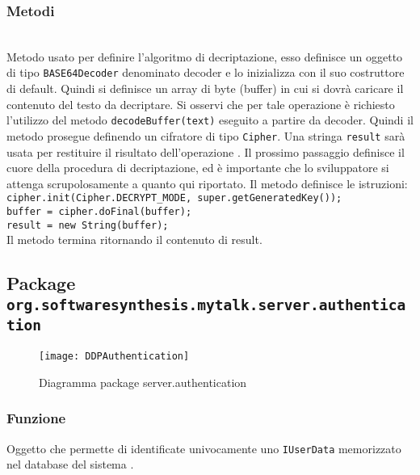 \subsubsection*{Metodi}
\begin{description}

	\item{}\\
	Metodo usato per definire l'algoritmo di decriptazione, esso definisce un oggetto di tipo \texttt{BASE64Decoder} denominato decoder e lo inizializza con il suo costruttore di default. Quindi si definisce un array di byte (buffer) in cui si dovrà caricare il contenuto del testo da decriptare. Si osservi che per tale operazione è richiesto l'utilizzo del metodo \texttt{decodeBuffer(text)} eseguito a partire da decoder. Quindi il metodo prosegue definendo  un cifratore di tipo \texttt{Cipher}. Una stringa \texttt{result} sarà usata per restituire il risultato dell'operazione . Il prossimo passaggio definisce il cuore della procedura di decriptazione, ed è importante che lo sviluppatore si attenga scrupolosamente a quanto qui riportato. Il metodo definisce le istruzioni:\\
	
	\verb|cipher.init(Cipher.DECRYPT_MODE, super.getGeneratedKey());|\\
	\verb|buffer = cipher.doFinal(buffer);|\\
	\verb|result = new String(buffer);|\\
	
	Il metodo termina ritornando il contenuto di result.
	
\end{description}

\subsection{Package \texttt{org.softwaresynthesis.mytalk.server.authentication}}\label{sec:authentication}

\begin{center}
\begin{figure}[H]
  \texttt{[image: DDPAuthentication]}
\caption{Diagramma package server.authentication}
\end{figure}
\end{center}


\subsubsection*{Funzione}
Oggetto che permette di identificate univocamente uno \texttt{IUserData} memorizzato nel database del sistema \caName.

